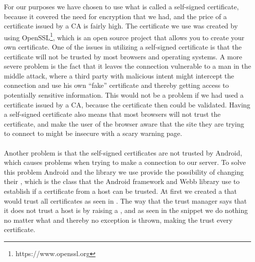 For our purposes we have chosen to use what is called a self-signed certificate, because it covered the need for encryption that we had, and the price of a certificate issued by a CA is fairly high. The certificate we use was created by using OpenSSL\footnote{https://www.openssl.org}, which is an open source project that allows you to create your own certificate. One of the issues in utilizing a self-signed certificate is that the certificate will not be trusted by most browsers and operating systems. A more severe problem is the fact that it leaves the connection vulnerable to a man in the middle attack, where a third party with malicious intent might intercept the connection and use his own ``fake'' certificate and thereby getting access to potentially sensitive information. This would not be a problem if we had used a certificate issued by a CA, because the certificate then could be validated. Having a self-signed certificate also means that most browsers will not trust the certificate, and make the user of the browser aware that the site they are trying to connect to might be insecure with a scary warning page. 
\\\\
Another problem is that the self-signed certificates are not trusted by Android, which causes problems when trying to make a connection to our server. To solve this problem Android and the library we use provide the possibility of changing their , which is the class that the Android framework and Webb library use to establish if a certificate from a host can be trusted. At first we created a  that would trust all certificates as seen in . The way that the trust manager says that it does not trust a host is by raising a , and as seen in the snippet we do nothing no matter what and thereby no exception is thrown, making the  trust every certificate. 


\FloatBarrier

